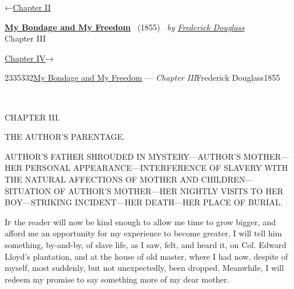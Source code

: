 \hypertarget{headerContainer}{}
\hypertarget{navigationHeader}{}
\protect\hypertarget{headerprevious}{}{←\href{/wiki/My_Bondage_and_My_Freedom_(1855)/Chapter_II}{Chapter
II}}

\textbf{\protect\hypertarget{header_title_text}{}{\href{/wiki/My_Bondage_and_My_Freedom_(1855)}{My
Bondage and My Freedom}}} ~(1855)~ \emph{by
\href{/wiki/Author:Frederick_Douglass}{\protect\hypertarget{header_author_text}{}{{Frederick
Douglass}}}}\\
\protect\hypertarget{header_section_text}{}{Chapter III}

\protect\hypertarget{headernext}{}{\href{/wiki/My_Bondage_and_My_Freedom_(1855)/Chapter_IV}{Chapter
IV}→}

\hypertarget{navigationNotes}{}

\hypertarget{ws-data}{}
\protect\hypertarget{ws-article-id}{}{2335332}\protect\hypertarget{ws-title}{}{\href{/wiki/My_Bondage_and_My_Freedom_(1855)}{My
Bondage and My Freedom} --- \emph{Chapter
III}}\protect\hypertarget{ws-author}{}{Frederick
Douglass}\protect\hypertarget{ws-year}{}{1855}

{\protect\hypertarget{51}{}{}}

~

{CHAPTER III.}

THE AUTHOR'S PARENTAGE.

{AUTHOR'S FATHER SHROUDED IN MYSTERY---AUTHOR'S MOTHER---HER PERSONAL
APPEARANCE---INTERFERENCE OF SLAVERY WITH THE NATURAL AFFECTIONS OF
MOTHER AND CHILDREN---SITUATION OF AUTHOR'S MOTHER---HER NIGHTLY VISITS
TO HER BOY---STRIKING INCIDENT---HER DEATH---HER PLACE OF BURIAL.}

\textsc{If} the reader will now be kind enough to allow me time to grow
bigger, and afford me an opportunity for my experience to become
greater, I will tell him something, by-and-by, of slave life, as I saw,
felt, and heard it, on Col. Edward Lloyd's plantation, and at the house
of old master, where I had now, despite of myself, most suddenly, but
not unexpectedly, been dropped. Meanwhile, I will redeem my promise to
say something more of my dear mother.

